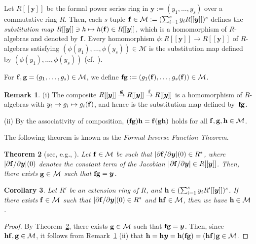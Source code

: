 \documentclass{amsart}
\theoremstyle{plain}
\newtheorem{thm}{Theorem}[section]
\newtheorem{cor}[thm]{Corollary}
\theoremstyle{definition}
\newtheorem{rem}[thm]{Remark}
\newcommand{\nd}{\noindent}
\newcommand{\y}{{\boldsymbol y}}
\newcommand{\ff}{{\bf f}}
\newcommand{\bg}{{\bf g}}
\newcommand{\bh}{{\bf h}}
\newcommand{\Ryy}{R[[\y]]}
\begin{document}
Let $R[[\y ]]$ be the formal power series ring in $\y :=(y_1,\ldots ,y_s)$ 
over a commutative ring $R$. 
Then, 
each $s$-tuple 
$\ff \in \mathcal{M}:=(\sum _{i=1}^sy_i\Ryy )^s$ 
defines the {\it substitution map} 
$\Ryy \ni h\mapsto h(\ff )\in \Ryy $, 
which is a homomorphism of $R$-algebras and denoted by $\ff $. 
Every homomorphism $\phi :R[[\y ]]\to R[[\y ]]$ 
of $R$-algebras satisfying 
$(\phi(y_1),\ldots ,\phi (y_s))\in \mathcal{M}$ 
is the substitution map defined by 
$(\phi(y_1),\ldots ,\phi (y_s))$ 
(cf.\ \cite[Chapter VII, \S 1, 
pp.~135--136]{ZS}). 


For $\ff ,\bg =(g_1,\ldots ,g_s)\in \mathcal{M}$, 
we define $\ff \bg :=(g_1(\ff ),\ldots ,g_s(\ff ))\in \mathcal{M}$. 


\begin{rem}\label{lem:associative}\rm 
(i) 
The composite 
$R[[\y ]]\stackrel{\bg }{\to }R[[\y ]]\stackrel{\ff }{\to }R[[\y ]]$ 
is a homomorphism of $R$-algebras with 
$y_i\mapsto g_i\mapsto g_i(\ff )$, 
and hence is 
the substitution map defined by~$\ff \bg $. 


\nd (ii) 
By the associativity of composition, 
$(\ff \bg )\bh =\ff (\bg \bh )$ 
holds for all $\ff ,\bg ,\bh\in \mathcal{M}$. 
\end{rem}



The following theorem is known as the {\it Formal Inverse Function Theorem}. 



\begin{thm}[see, e.g., {\cite[Theorem 1.1.2]{Essen}}]
\label{thm:FIFT}
Let $\ff \in \mathcal{M}$ be such that 
$|\partial \ff /\partial \y |(0)\in R^*$, 
where $|\partial \ff /\partial \y |(0)$ denotes the 
constant term of the Jacobian 
$|\partial \ff /\partial \y |\in R[[\y ]]$. 
Then, 
there exists 
$\bg \in \mathcal{M}$ 
such that $\ff \bg =\y $. 
\end{thm}


\begin{cor}\label{lem:2023Feb}
Let $R'$ be an extension ring of $R$, 
and $\bh \in (\sum _{i=1}^sy_iR'[[\y ]])^s$. 
If there exists $\ff \in \mathcal{M}$ 
such that $|\partial \ff /\partial \y |(0)\in R^*$ 
and $\bh \ff \in \mathcal{M}$, 
then we have $\bh \in \mathcal{M}$. 
\end{cor}
\begin{proof}
By Theorem~\ref{thm:FIFT}, 
there exists $\bg \in \mathcal{M}$ such that $\ff \bg =\y $. 
Then, since $\bh \ff ,\bg \in \mathcal{M}$, 
it follows from Remark~\ref{lem:associative} (ii) that 
$\bh =\bh \y =\bh (\ff \bg )=(\bh \ff )\bg \in \mathcal{M}$. 
\end{proof}
\end{document}
